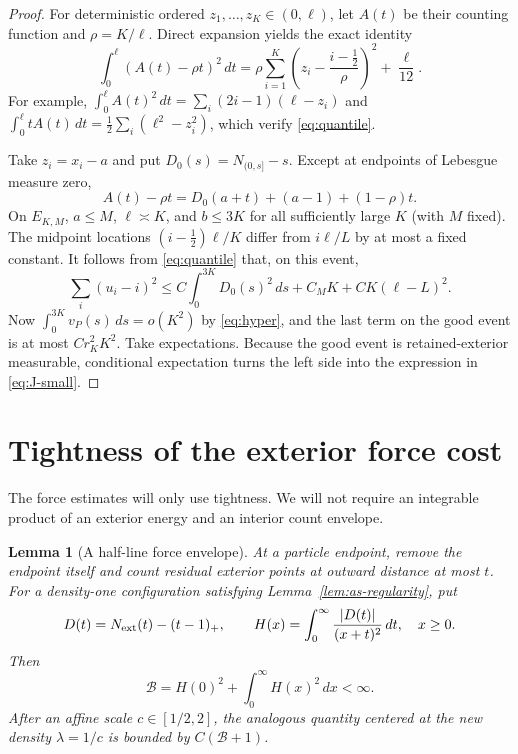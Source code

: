 \documentclass[11pt,reqno]{amsart}
\numberwithin{equation}{section}
\newtheorem{lemma}[theorem]{Lemma}
\theoremstyle{definition}
\theoremstyle{remark}
\newcommand{\1}{\mathbf 1}
\newcommand{\dd}{\,d}
\newcommand{\calB}{\mathcal B}
\begin{document}
\begin{proof}
For deterministic ordered $z_1,\ldots,z_K\in(0,\ell)$, let $A(t)$ be
their counting function and $\rho=K/\ell$. Direct expansion yields the
exact identity
\begin{equation}\label{eq:quantile}
\int_0^\ell(A(t)-\rho t)^2\dd t
=\rho\sum_{i=1}^K
\left(z_i-\frac{i-\frac12}{\rho}\right)^2+\frac{\ell}{12}.
\end{equation}
For example,
$\int_0^\ell A(t)^2\dd t=\sum_i(2i-1)(\ell-z_i)$ and
$\int_0^\ell tA(t)\dd t=\frac12\sum_i(\ell^2-z_i^2)$, which verify
\eqref{eq:quantile}.

Take $z_i=x_i-a$ and put $D_0(s)=N_{(0,s]}-s$. Except at endpoints of
Lebesgue measure zero,
\[
A(t)-\rho t=D_0(a+t)+(a-1)+(1-\rho)t.
\]
On $E_{K,M}$, $a\le M$, $\ell\asymp K$, and $b\le3K$ for all
sufficiently large $K$ (with $M$ fixed). The midpoint locations
$(i-\frac12)\ell/K$ differ from $i\ell/L$ by at most a fixed constant.
It follows from \eqref{eq:quantile} that, on this event,
\begin{equation}\label{eq:quadratic-bound}
\sum_i(u_i-i)^2
\le C\int_0^{3K}D_0(s)^2\dd s+C_MK+CK(\ell-L)^2.
\end{equation}
Now $\int_0^{3K}v_P(s)\dd s=o(K^2)$ by \eqref{eq:hyper}, and the last
term on the good event is at most $Cr_K^2K^2$. Take expectations.
Because the good event is retained-exterior measurable, conditional
expectation turns the left side into the expression in
\eqref{eq:J-small}.
\end{proof}

\section{Tightness of the exterior force cost}\label{sec:forces}

The force estimates will only use tightness. We will not require an
integrable product of an exterior energy and an interior count envelope.

\begin{lemma}[A half-line force envelope]\label{lem:halfline}
At a particle endpoint, remove the endpoint itself and count residual
exterior points at outward distance at most $t$. For a density-one
configuration satisfying Lemma~\ref{lem:as-regularity}, put
\[
D(t)=N_{\rm ext}(t)-(t-1)_+,\qquad
H(x)=\int_0^\infty\frac{|D(t)|}{(x+t)^2}\dd t,\quad x\ge0.
\]
Then
\begin{equation}\label{eq:B}
\calB=H(0)^2+\int_0^\infty H(x)^2\dd x<\infty.
\end{equation}
After an affine scale $c\in[1/2,2]$, the analogous quantity centered at
the new density $\lambda=1/c$ is bounded by $C(\calB+1)$.
\end{lemma}
\end{document}
